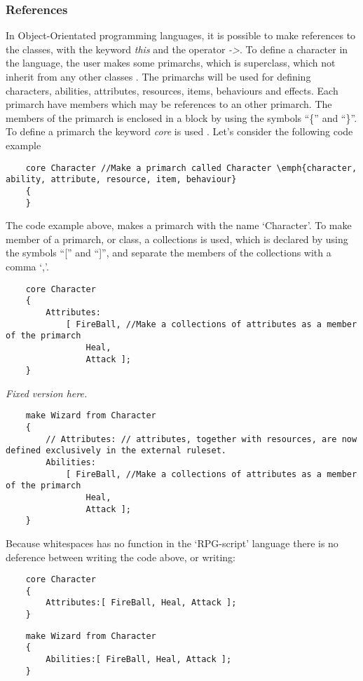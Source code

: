 \subsubsection*{References}
In Object-Orientated programming languages, it is possible to make references to the classes, with the keyword \emph{this} and the operator \emph{->}. 
To define a character in the language, the user makes some primarchs, which is superclass, which not inherit from any other classes . The primarchs will be used for defining characters, abilities, attributes, resources, items, behaviours and effects.
Each primarch have members which may be references to an other primarch. The members of the primarch is enclosed in a block by using the symbols ``\{'' and ``\}''. To define a primarch the keyword \emph{core} is used .
Let's consider the following code example 
\begin{lstlisting}
	core Character //Make a primarch called Character \emph{character, ability, attribute, resource, item, behaviour}
	{
	}
\end{lstlisting}
The code example above, makes a primarch with the name `Character'. 
To make member of a primarch, or class, a collections is used, which is declared by using the symbols ``['' and ``]'', and separate the members of the collections with a comma `,'.
\begin{lstlisting}
	core Character
	{
		Attributes:
			[ FireBall, //Make a collections of attributes as a member of the primarch
				Heal,
				Attack ]; 
	}
\end{lstlisting}
\emph{Fixed version here.}
\begin{lstlisting}
	make Wizard from Character
	{	
		// Attributes: // attributes, together with resources, are now defined exclusively in the external ruleset.
		Abilities:
			[ FireBall, //Make a collections of attributes as a member of the primarch
				Heal,
				Attack ]; 
	}
\end{lstlisting}
Because whitespaces has no function in the `RPG-script' language there is no deference between writing the code above, or writing:
\begin{lstlisting}
	core Character
	{
		Attributes:[ FireBall, Heal, Attack ];
	}
\end{lstlisting}
\begin{lstlisting}
	make Wizard from Character
	{
		Abilities:[ FireBall, Heal, Attack ];
	}
\end{lstlisting}
